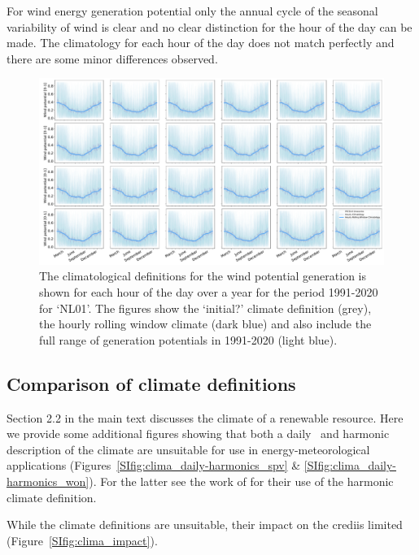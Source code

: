 \documentclass[12pt]{iopart}
\newcommand{\credi}[0]{{\sc credi}}
\begin{document}
For wind energy generation potential only the annual cycle of the seasonal variability of wind is clear and no clear distinction for the hour of the day can be made. 
The climatology for each hour of the day does not match perfectly and there are some minor differences observed.
\begin{figure}[ht!]
    \centering
    \includegraphics[width=\textwidth]{Figures_SI/climatology_wind_hourly.pdf}
    \caption{
    The climatological definitions for the wind potential generation is shown for each hour of the day over a year for the period 1991-2020 for `NL01'. 
    The figures show the `initial?' climate definition (grey), the hourly rolling window climate (dark blue) and also include the full range of generation potentials in 1991-2020 (light blue). }
    \label{SIfig:climate_wind_hourly}
\end{figure}



\subsection{Comparison of climate definitions}\label{app:Harmonics}
Section 2.2 in the main text discusses the climate of a renewable resource. 
Here we provide some additional figures showing that both a daily~\parencite{wmo2017normals} and harmonic description of the climate are unsuitable for use in energy-meteorological applications (Figures~\ref{SIfig:clima_daily-harmonics_spv} \& \ref{SIfig:clima_daily-harmonics_won}). 
For the latter see the work of \textcite{Sabziparvar2014,Fischer2019,Rayson2021} for their use of the harmonic climate definition. 

While the climate definitions are unsuitable, their impact on the \credi is limited (Figure~\ref{SIfig:clima_impact}). 
\end{document}
